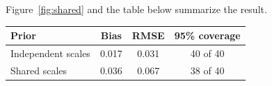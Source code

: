 Figure~\ref{fig:shared} and the table below summarize the result.

\begin{center}
\begin{tabular}{lccc}
\toprule
Prior & Bias & RMSE & 95\% coverage \\
\midrule
Independent scales & 0.017 & 0.031 & 40 of 40 \\
Shared scales & 0.036 & 0.067 & 38 of 40 \\
\bottomrule
\end{tabular}
\end{center}
